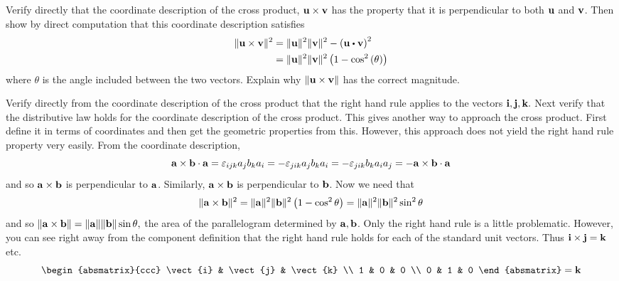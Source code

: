 \begin{enumialphparenastyle}
\begin{ex} Verify directly that the coordinate description of the cross product, 
${\bf u}\times {\bf v}$ has the property that it is perpendicular to both 
${\bf u}$ and ${\bf v}$. Then show by direct computation that this
coordinate description satisfies
\begin{align*}
\norm{\vect{u}\times \vect{v}} ^{2}& =\norm{\vect{u}
} ^{2}\norm{\vect{v}} ^{2}-\tup{\vect{u}\dotprod \vect{v}} ^{2} \\
& =\norm{\vect{u}} ^{2}\norm{\vect{v}}
^{2}\tup{1-\cos ^{2}\tup{\theta } }
\end{align*}
where $\theta $ is the angle included between the two vectors. Explain why 
$\|{\bf u}\times {\bf v}\| $ has the correct magnitude.
\begin{sol}
Verify directly from the coordinate description of the cross product that the right hand rule applies to the vectors ${\bf i},{\bf j},{\bf k}.$ Next verify that the
distributive law holds for the coordinate description of the cross product.
This gives another way to approach the cross product. First define it in
terms of coordinates and then get the geometric properties from this.
However, this approach does not yield the right hand rule property very
easily. From the coordinate description,
\[
{\bf a}\times {\bf b}\cdot {\bf a}=\varepsilon _{ijk}a_{j}b_{k}a_{i}=-\varepsilon
_{jik}a_{j}b_{k}a_{i}=-\varepsilon _{jik}b_{k}a_{i}a_{j}=-{\bf a}\times
{\bf b}\cdot {\bf a}
\]
and so ${\bf a}\times {\bf b}$ is perpendicular to ${\bf a}$. Similarly, $
{\bf a}\times {\bf b}$ is perpendicular to ${\bf b}$. Now we need that 
\[
\|{\bf a}\times {\bf b}\| ^{2}=\|{\bf a}
\| ^{2}\|{\bf b}\| ^{2}\left(1-\cos
^{2}\theta \right) =\|{\bf a}\| ^{2}\|{\bf b
}\| ^{2}\sin ^{2}\theta
\]
and so $\|{\bf a}\times {\bf b}\| =\|{\bf a}
\| \|{\bf b}\| \sin \theta ,$ the area of the
parallelogram determined by ${\bf a},{\bf b}$. Only the right hand rule is a
little problematic. However, you can see right away from the component
definition that the right hand rule holds for each of the standard unit
vectors. Thus ${\bf i}\times {\bf j}={\bf k}$ etc.
\[
\begin{absmatrix}{ccc}
\vect{i} & \vect{j} & \vect{k} \\
1 & 0 & 0 \\
0 & 1 & 0
\end{absmatrix}=\vect{k}
\]
\end{sol}
\end{ex}


\end{enumialphparenastyle}